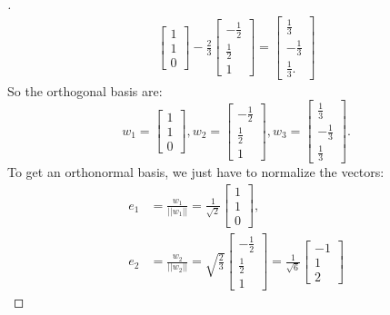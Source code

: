 \documentclass[11pt]{article}
\begin{document}
\begin{enumerate}
\begin{proof}[\unskip\nopunct]
\begin{align*}
\begin{bmatrix}
                        1 \\ 1 \\ 0
                    \end{bmatrix} - \frac{2}{3} \begin{bmatrix}
                        - \frac{1}{2} \\ \frac{1}{2} \\ 1
                    \end{bmatrix} = \begin{bmatrix}
                        \frac{1}{3} \\ - \frac{1}{3} \\ \frac{1}{3}.
                    \end{bmatrix}
            \end{align*}
            So the orthogonal basis are: \[w_1 = \begin{bmatrix}
                1 \\ 1 \\ 0
            \end{bmatrix}, w_2 = \begin{bmatrix}
                - \frac{1}{2} \\ \frac{1}{2} \\ 1
            \end{bmatrix}, w_3 = \begin{bmatrix}
                \frac{1}{3} \\ - \frac{1}{3} \\ \frac{1}{3}
            \end{bmatrix}.\] To get an orthonormal basis, we just have to normalize the vectors:
            \begin{align*}
                e_1 &= \frac{w_1}{||w_1||} = \frac{1}{\sqrt{2}} \begin{bmatrix}
                    1 \\ 1 \\ 0
                \end{bmatrix}, \\
                e_2 &= \frac{w_2}{||w_2||} = \sqrt{\frac{2}{3}} \begin{bmatrix}
                    - \frac{1}{2} \\ \frac{1}{2} \\ 1
                \end{bmatrix} = \frac{1}{\sqrt{6}} \begin{bmatrix}
                    -1 \\ 1 \\ 2

\end{bmatrix}
\end{align*}
\end{proof}
\end{enumerate}
\end{document}
